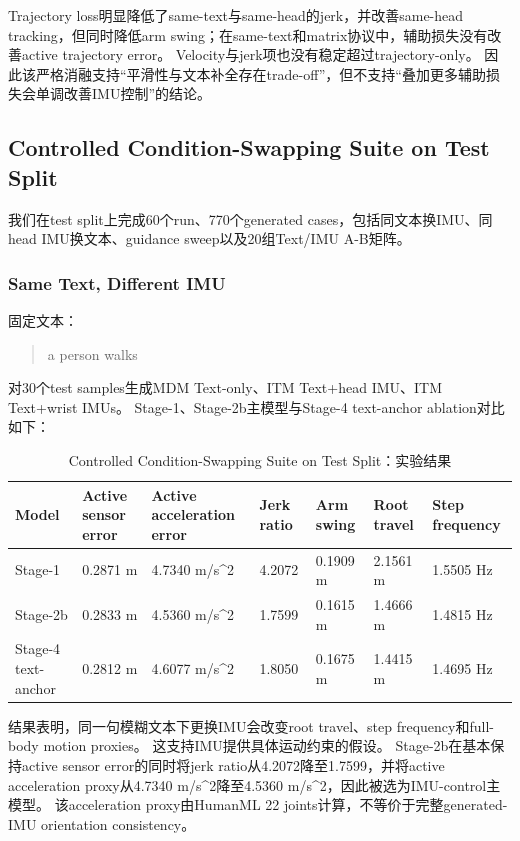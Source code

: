 Trajectory loss明显降低了same-text与same-head的jerk，并改善same-head tracking，但同时降低arm swing；在same-text和matrix协议中，辅助损失没有改善active trajectory error。
Velocity与jerk项也没有稳定超过trajectory-only。
因此该严格消融支持“平滑性与文本补全存在trade-off”，但不支持“叠加更多辅助损失会单调改善IMU控制”的结论。

\subsection{Controlled Condition-Swapping Suite on Test Split}

我们在test split上完成60个run、770个generated cases，包括同文本换IMU、同head IMU换文本、guidance sweep以及20组Text/IMU A-B矩阵。

\subsubsection{Same Text, Different IMU}

固定文本：

\begin{quote}a person walks\end{quote}

对30个test samples生成MDM Text-only、ITM Text+head IMU、ITM Text+wrist IMUs。
Stage-1、Stage-2b主模型与Stage-4 text-anchor ablation对比如下：

\begin{table}[t]
\centering
\caption{Controlled Condition-Swapping Suite on Test Split：实验结果}
\label{tab:result-13}
\footnotesize
\setlength{\tabcolsep}{3pt}
\renewcommand{\arraystretch}{1.15}
\begin{tabularx}{\linewidth}{LLLLLLL}
\toprule
Model & Active sensor error & Active acceleration error & Jerk ratio & Arm swing & Root travel & Step frequency \\
\midrule
Stage-1 & 0.2871 m & 4.7340 m/s\textasciicircum{}2 & 4.2072 & 0.1909 m & 2.1561 m & 1.5505 Hz \\
Stage-2b & 0.2833 m & 4.5360 m/s\textasciicircum{}2 & 1.7599 & 0.1615 m & 1.4666 m & 1.4815 Hz \\
Stage-4 text-anchor & 0.2812 m & 4.6077 m/s\textasciicircum{}2 & 1.8050 & 0.1675 m & 1.4415 m & 1.4695 Hz \\
\bottomrule
\end{tabularx}
\end{table}


结果表明，同一句模糊文本下更换IMU会改变root travel、step frequency和full-body motion proxies。
这支持IMU提供具体运动约束的假设。
Stage-2b在基本保持active sensor error的同时将jerk ratio从4.2072降至1.7599，并将active acceleration proxy从4.7340 m/s\textasciicircum{}2降至4.5360 m/s\textasciicircum{}2，因此被选为IMU-control主模型。
该acceleration proxy由HumanML 22 joints计算，不等价于完整generated-IMU orientation consistency。

